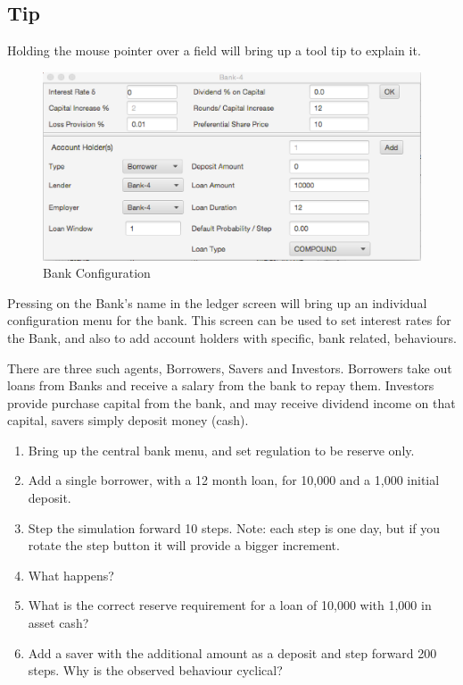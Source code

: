 \documentclass{article}
\begin{document}
\subsection*{Tip}
Holding the mouse pointer over a field will bring up a tool tip to explain it.
\begin{figure}[h]
\begin{center}
\includegraphics[width=12cm]{lab_fig_2.eps} 
\caption{Bank Configuration}
\end{center}
\end{figure}
Pressing on the Bank's name in the ledger screen will bring up an 
individual configuration menu for the bank. This screen can be
used to set interest rates for the Bank, and also to add account holders
with specific, bank related, behaviours.
\par
There are three such agents, Borrowers, Savers and Investors. Borrowers take out
loans from Banks and receive a salary from the bank to repay them. Investors
provide purchase capital from the bank, and may receive dividend income on that
capital, savers simply deposit money (cash).

\begin{enumerate}
\item Bring up the central bank menu, and set regulation to be reserve
only.
\item Add a single borrower, with a 12 month loan, for 10,000 and a 1,000
initial deposit.
\item Step the simulation forward 10 steps. Note: each step is one day,
but if you rotate the step button it will provide
a bigger increment.
\item What happens?
\item What is the correct reserve requirement for a loan of 10,000 with
1,000 in asset cash?
\item Add a saver with the additional amount as a deposit and step forward
200 steps. Why is the observed behaviour cyclical?
\end{enumerate}
\end{document}
